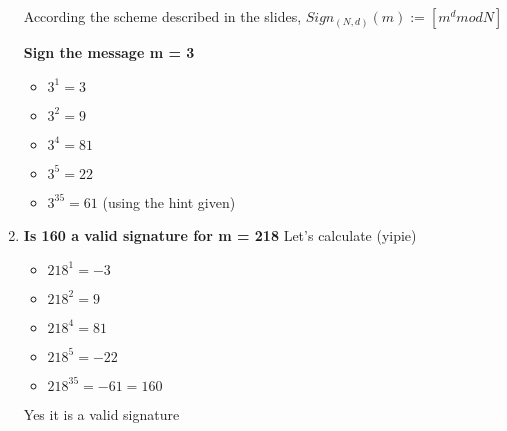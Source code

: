\begin{solution}
\begin{enumerate}
      According the scheme described in the slides, $Sign_{(N, d)}(m) := [m^d mod N]$ 
      
      \textbf{Sign the message m = 3} 
      \begin{itemize}
          \item $3^{1} = 3 $
          \item $3^{2} = 9 $
          \item $3^{4} = 81 $
          \item $3^{5} = 22 $
          \item $3^{35} = 61 $ (using the hint given)
      \end{itemize}
      \item \textbf{Is 160 a valid signature for m = 218}
      Let's calculate (yipie) 
      \begin{itemize}
          \item $218^{1} = -3 $
          \item $218^{2} = 9 $
          \item $218^{4} = 81 $
          \item $218^{5} = -22 $
          \item $218^{35} = -61 = 160$
      \end{itemize}
      Yes it is a valid signature
  \end{enumerate}
\end{solution}
